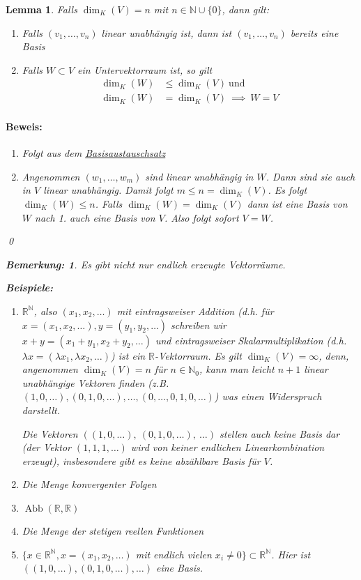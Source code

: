 \documentclass{report}
\newcommand{\lb}{\lambda}
\newcommand{\R}{\mathbb{R}}
\newcommand{\N}{\mathbb{N}}
\newcommand{\mR}{\(\mathbb{R}\)}
\DeclareMathOperator{\abb}{Abb}
\theoremstyle{customrem}
\newtheorem*{bemerkung}{Bemerkung\textnormal:}
\theoremstyle{customdef}
\newtheorem{lemma}[definition]{Lemma}
\renewenvironment{proof}{\paragraph{Beweis: }}{\qed}
\theoremstyle{customenv}
\begin{document}
	\begin{lemma}
		Falls \(\dim_K(V) = n\) mit \(n \in \N \cup \{0\}\), dann gilt:
		\begin{enumerate}
			\item Falls \((v_1, \dots, v_n)\) linear unabhängig ist, dann ist \((v_1, \ldots, v_n)\) bereits eine Basis
			\item Falls \(W \subset V\) ein Untervektorraum ist, so gilt
			\begin{align*}
			\dim_K(W) &\le \dim_K(V)\ \text{und}\\
			\dim_K(W) &= \dim_K(V)\ \implies \ W = V
			\end{align*}
		\end{enumerate}

		\begin{proof}
			\begin{enumerate}
				\item Folgt aus dem \hyperref[satz215]{Basisaustauschsatz}
				\item Angenommen \((w_1, \dots, w_m)\) sind linear unabhängig in \(W\). Dann sind sie auch in \(V\) linear unabhängig. Damit folgt \(m \leq n = \dim_K(V)\). Es folgt \(\dim_K(W) \leq n\). Falls \(\dim_K(W) = \dim_K(V)\) dann ist eine Basis von \(W\) nach 1. auch eine Basis von \(V\). Also folgt sofort \(V = W\).
			\end{enumerate}
		\end{proof}
		\begin{bemerkung}
			Es gibt nicht nur endlich erzeugte Vektorräume.\\
		\end{bemerkung}
		\begin{minipage}{\textwidth}
			\textbf{Beispiele: }
			\begin{enumerate}
				\item \(\R^\N\), also \((x_1, x_2, \ldots)\) mit eintragsweiser Addition (d.h. für \(x = (x_1, x_2, \ldots), y = (y_1, y_2, \ldots)\) schreiben wir \(x + y = (x_1 + y_1, x_2 + y_2, \ldots)\) und eintragsweiser Skalarmultiplikation (d.h. \(\lb x = (\lb x_1, \lb x_2, \ldots)\)) ist ein \mR -Vektorraum. Es gilt \(\dim_K(V) = \infty\), denn, angenommen \(\dim_K(V) = n\) für \(n \in \N_0\), kann man leicht \(n + 1\) linear unabhängige Vektoren finden (z.B. \((1, 0, \ldots), (0, 1, 0, \ldots), \dots, (0, \ldots, 0, 1, 0, \ldots)\)) was einen Widerspruch darstellt. \Lightning

				Die Vektoren \(((1, 0, \dots),\ (0, 1, 0, \dots),\ \dots)\) stellen auch keine Basis dar (der Vektor \((1, 1, 1, \ldots)\) wird von keiner \textit{endlichen} Linearkombination erzeugt), insbesondere gibt es keine abzählbare Basis für \(V\).
				\item Die Menge konvergenter Folgen
				\item \(\abb(\R, \R)\)
				\item Die Menge der stetigen reellen Funktionen
				\item  \(\{x \in \R^\N, x = (x_1, x_2, \dots)\) mit endlich vielen \(x_i \neq 0\} \subset \R^\N\). Hier ist \(((1, 0, \dots), (0, 1, 0, \dots), \dots)\) eine Basis.
			\end{enumerate}
		\end{minipage}
	\end{lemma}
\end{document}
